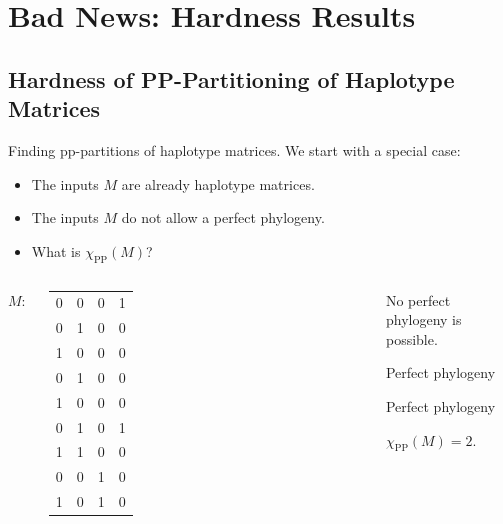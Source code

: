 \documentclass{beamer}
\begin{document}
\section{Bad News: Hardness Results}

\subsection{Hardness of PP-Partitioning of Haplotype Matrices}

\begin{frame}{Finding pp-partitions of haplotype matrices.}
  We start with a special case:
  \begin{itemize}
  \item The inputs $M$ are \alert{already haplotype matrices}.
  \item The inputs $M$ \alert{do not allow a perfect phylogeny}.
  \item What is $\chi_{\operatorname{PP}}(M)$?
  \end{itemize}
  \begin{example}
    \begin{columns}
      $M\colon$
      \footnotesize
      \begin{tabular}{cccc}
        0 & 0 & 0 & 1 \\
        0 & 1 & 0 & 0 \\
        1 & 0 & 0 & 0 \\
        0 & 1 & 0 & 0 \\
        1 & 0 & 0 & 0 \\
        0 & 1 & 0 & 1 \\
        1 & 1 & 0 & 0 \\
        0 & 0 & 1 & 0 \\
        1 & 0 & 1 & 0
      \end{tabular}%
      {%
      }
      \begin{overprint}
        No perfect phylogeny is possible.
        
        \textcolor{blue!70!bg}{Perfect phylogeny}
        
        \textcolor{red!70!bg}{Perfect phylogeny}
        
        $\chi_{\operatorname{PP}}(M) = 2$.
        
      \end{overprint}
    \end{columns}
  \end{example}
\end{frame}
\end{document}
